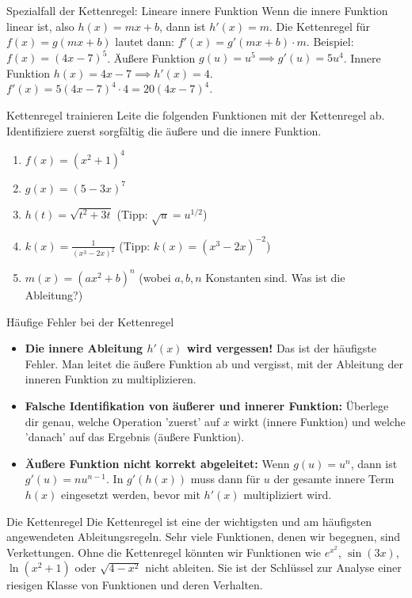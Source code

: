 \begin{tippumgebung}{Spezialfall der Kettenregel: Lineare innere Funktion}
Wenn die innere Funktion linear ist, also $h(x) = mx+b$, dann ist $h'(x)=m$.
Die Kettenregel für $f(x) = g(mx+b)$ lautet dann:
$f'(x) = g'(mx+b) \cdot m$.
Beispiel: $f(x) = (4x-7)^5$. Äußere Funktion $g(u)=u^5 \implies g'(u)=5u^4$. Innere Funktion $h(x)=4x-7 \implies h'(x)=4$.
$f'(x) = 5(4x-7)^4 \cdot 4 = 20(4x-7)^4$.
\end{tippumgebung}

\begin{aufgabenumgebung}{Kettenregel trainieren}
Leite die folgenden Funktionen mit der Kettenregel ab. Identifiziere zuerst sorgfältig die äußere und die innere Funktion.
\begin{enumerate}
    \item $f(x) = (x^2+1)^4$
    \item $g(x) = (5-3x)^7$
    \item $h(t) = \sqrt{t^2+3t}$ (Tipp: $\sqrt{u} = u^{1/2}$)
    \item $k(x) = \frac{1}{(x^3-2x)^2}$ (Tipp: $k(x) = (x^3-2x)^{-2}$)
    \item $m(x) = (ax^2+b)^n$ (wobei $a,b,n$ Konstanten sind. Was ist die Ableitung?)
\end{enumerate}
\end{aufgabenumgebung}

\begin{fehlerboxumgebung}{Häufige Fehler bei der Kettenregel}
\begin{itemize}
    \item \textbf{Die innere Ableitung $h'(x)$ wird vergessen!} Das ist der häufigste Fehler. Man leitet die äußere Funktion ab und vergisst, mit der Ableitung der inneren Funktion zu multiplizieren.
    \item \textbf{Falsche Identifikation von äußerer und innerer Funktion:} Überlege dir genau, welche Operation 'zuerst' auf $x$ wirkt (innere Funktion) und welche 'danach' auf das Ergebnis (äußere Funktion).
    \item \textbf{Äußere Funktion nicht korrekt abgeleitet:} Wenn $g(u)=u^n$, dann ist $g'(u)=nu^{n-1}$. In $g'(h(x))$ muss dann für $u$ der gesamte innere Term $h(x)$ eingesetzt werden, bevor mit $h'(x)$ multipliziert wird.
\end{itemize}
\end{fehlerboxumgebung}

\begin{warumwichtigumgebung}{Die Kettenregel}
Die Kettenregel ist eine der wichtigsten und am häufigsten angewendeten Ableitungsregeln. Sehr viele Funktionen, denen wir begegnen, sind Verkettungen. Ohne die Kettenregel könnten wir Funktionen wie $e^{x^2}$, $\sin(3x)$, $\ln(x^2+1)$ oder $\sqrt{4-x^2}$ nicht ableiten. Sie ist der Schlüssel zur Analyse einer riesigen Klasse von Funktionen und deren Verhalten.
\end{warumwichtigumgebung}

